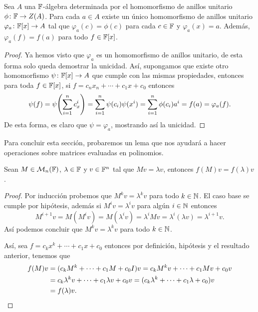 \begin{prop}\label{prop:EvalPoly}
  Sea $A$ una $\mathbb{F}$-álgebra determinada por el homomorfismo de anillos unitario $\phi\colon \mathbb{F}\to Z(A)$. Para cada $a \in A$ existe un único homomorfismo de anillos unitario $\varphi_a \colon \mathbb{F}[x] \to A$ tal que $\varphi_a(c) = \phi(c)$ para cada $c \in \mathbb{F}$ y $\varphi_a(x) = a$. Además, $\varphi_a(f) = f(a)$ para todo $f \in \mathbb{F}[x]$.
\end{prop}
\begin{proof}
  Ya hemos visto que $\varphi_a$ es un homomorfismo de anillos unitario, de esta forma solo queda demostrar la unicidad. Así, supongamos que existe otro homomorfismo $\psi\colon \mathbb{F}[x] \to A$ que cumple con las mismas propiedades, entonces para toda $f \in \mathbb{F}[x]$, si $f = c_n x_n + \cdots+ c_1x + c_0$ entonces
  \[
    \psi(f) = \psi\paren{\sum_{i=1}^n c_x^i} = \sum_{i=1}^n \psi(c_i) \psi(x^i) = \sum_{i=1}^n \phi(c_i) a^i = f(a) = \varphi_a(f).
  \]
  De esta forma, es claro que $\psi = \varphi_a$, mostrando así la unicidad.
\end{proof}

Para concluir esta sección, probaremos un lema que nos ayudará a hacer operaciones sobre matrices evaluadas en polinomios. 

\begin{lema}
  Sean $M \in \mathcal{M}_n(\mathbb{F})$, $\lambda \in \mathbb{F}$ y $v \in \mathbb{F}^n$ tal que $Mv = \lambda v$, entonces $f(M) v = f(\lambda) v$.
\end{lema}
\begin{proof}
  Por inducción probemos que $M^k v = \lambda^k v$ para todo $k \in \mathbb{N}$. El caso base se cumple por hipótesis, además si $M^i v = \lambda^i v $ para algún $i\in \mathbb{N}$ entonces 
    \[
      M^{i+1}v = M(M^iv) = M (\lambda^i v) = \lambda^i Mv = \lambda^i(\lambda v) = \lambda^{i+1}v.
    \]
  Así podemos concluir que  $M^k v = \lambda^k v$ para todo $k \in \mathbb{N}$.

  Así, sea $f = c_k x^k + \cdots + c_1 x + c_0$ entonces por definición, hipótesis y el resultado anterior, tenemos que
  \begin{align*}
    f(M)v &= ( c_k M^k + \cdots + c_1 M + c_0I) v 
       = c_k M^kv + \cdots + c_1 Mv + c_0v \\
      &= c_k\lambda^k v + \cdots + c_1 \lambda v + c_0v 
       = (c_k\lambda^k + \cdots + c_1 \lambda + c_0 )v \\
      &= f(\lambda) v. \qedhere
  \end{align*}
\end{proof}
